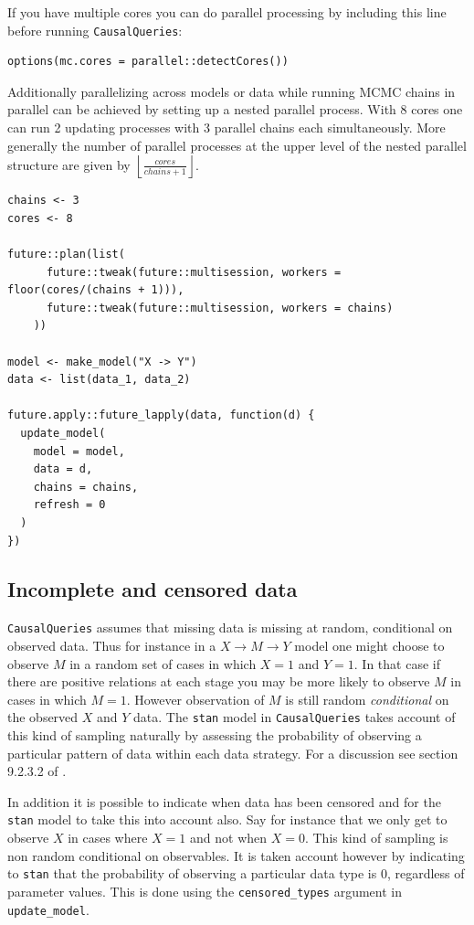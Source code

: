 \documentclass[
  article]{jss}
\begin{document}
If you have multiple cores you can do parallel processing by including
this line before running \texttt{CausalQueries}:

\begin{verbatim}
options(mc.cores = parallel::detectCores())
\end{verbatim}

Additionally parallelizing across models or data while running MCMC
chains in parallel can be achieved by setting up a nested parallel
process. With 8 cores one can run 2 updating processes with 3 parallel
chains each simultaneously. More generally the number of parallel
processes at the upper level of the nested parallel structure are given
by \(\left \lfloor \frac{cores}{chains + 1} \right \rfloor\).

\begin{verbatim}
chains <- 3
cores <- 8

future::plan(list(
      future::tweak(future::multisession, workers = floor(cores/(chains + 1))),
      future::tweak(future::multisession, workers = chains)
    ))

model <- make_model("X -> Y")
data <- list(data_1, data_2)

future.apply::future_lapply(data, function(d) {
  update_model(
    model = model,
    data = d,
    chains = chains,
    refresh = 0
  )
})
\end{verbatim}

\hypertarget{incomplete-and-censored-data}{%
\subsection{Incomplete and censored
data}\label{incomplete-and-censored-data}}

\texttt{CausalQueries} assumes that missing data is missing at random,
conditional on observed data. Thus for instance in a
\(X \rightarrow M \rightarrow Y\) model one might choose to observe
\(M\) in a random set of cases in which \(X=1\) and \(Y=1\). In that
case if there are positive relations at each stage you may be more
likely to observe \(M\) in cases in which \(M=1\). However observation
of \(M\) is still random \emph{conditional} on the observed \(X\) and
\(Y\) data. The \texttt{stan} model in \texttt{CausalQueries} takes
account of this kind of sampling naturally by assessing the probability
of observing a particular pattern of data within each data strategy. For
a discussion see section 9.2.3.2 of \citet{ii2023}.

In addition it is possible to indicate when data has been censored and
for the \texttt{stan} model to take this into account also. Say for
instance that we only get to observe \(X\) in cases where \(X=1\) and
not when \(X=0\). This kind of sampling is non random conditional on
observables. It is taken account however by indicating to \texttt{stan}
that the probability of observing a particular data type is 0,
regardless of parameter values. This is done using the
\texttt{censored\_types} argument in \texttt{update\_model}.
\end{document}
